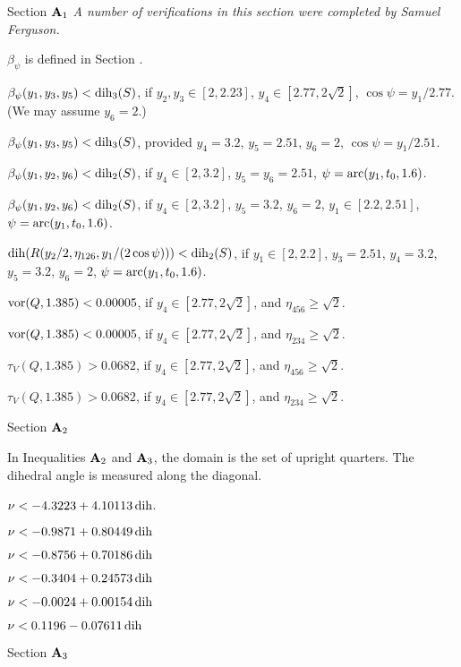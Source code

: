 \subhead Section ${\bold A}_1$\endsubhead
{\it A number of 
verifications in this section were completed by Samuel Ferguson.}

	$\beta_\psi$ is defined in Section .


 $\beta_\psi(y_1,y_3,y_5) <\operatorname{dih}_3(S)$,
if $y_2,y_3\in[2,2.23]$, $y_4\in[2.77,2\sqrt{2}]$, $\cos\psi=y_1/2.77$.
(We may assume $y_6=2$.)

  $\beta_\psi(y_1,y_3,y_5) <\operatorname{dih}_3(S)$,
provided  $y_4=3.2$, $y_5=2.51$, $y_6=2$, $\cos\psi=y_1/2.51$.

 $\beta_\psi(y_1,y_2,y_6)<\operatorname{dih}_2(S)$,
	if $y_4\in[2,3.2]$, $y_5=y_6=2.51$, $\psi=\operatorname{arc}(y_1,t_0,1.6)$.

  $\beta_\psi(y_1,y_2,y_6)<\operatorname{dih}_2(S)$,
	if $y_4\in[2,3.2]$, $y_5=3.2$, $y_6=2$, $y_1\in[2.2,2.51]$,
	$\psi=\operatorname{arc}(y_1,t_0,1.6)$.

$\operatorname{dih}(R(y_2/2,\eta_{126},y_1/(2\cos\psi)))<\operatorname{dih}_2(S)$,
if $y_1\in[2,2.2]$, $y_3=2.51$, $y_4=3.2$, $y_5=3.2$, $y_6=2$,
$\psi=\operatorname{arc}(y_1,t_0,1.6)$.

  $\operatorname{vor}(Q,1.385)<0.00005$, if $y_4\in[2.77,2\sqrt{2}]$,
		and $\eta_{456}\ge\sqrt2$.

  $\operatorname{vor}(Q,1.385)<0.00005$, if $y_4\in[2.77,2\sqrt{2}]$,
		and $\eta_{234}\ge\sqrt2$.

  $\tau_V(Q,1.385)>0.0682$, if $y_4\in[2.77,2\sqrt{2}]$,
		and $\eta_{456}\ge\sqrt2$.

  $\tau_V(Q,1.385)>0.0682$, if $y_4\in[2.77,2\sqrt{2}]$,
		and $\eta_{234}\ge\sqrt2$.


\subhead Section ${\bold A}_2$\endsubhead


In Inequalities ${\bold A}_2$ and ${\bold A}_3$,
the domain is the set of upright quarters.
The dihedral angle is measured along the diagonal.

 $\nu < -4.3223 + 4.10113\operatorname{dih}$.

 $\nu < -0.9871 + 0.80449\operatorname{dih}$

 $\nu < -0.8756 + 0.70186\operatorname{dih}$

 $\nu < -0.3404 + 0.24573\operatorname{dih}$

 $\nu < -0.0024 + 0.00154\operatorname{dih}$

 $\nu < 0.1196 - 0.07611\operatorname{dih}$

\subhead Section ${\bold A}_3$\endsubhead


